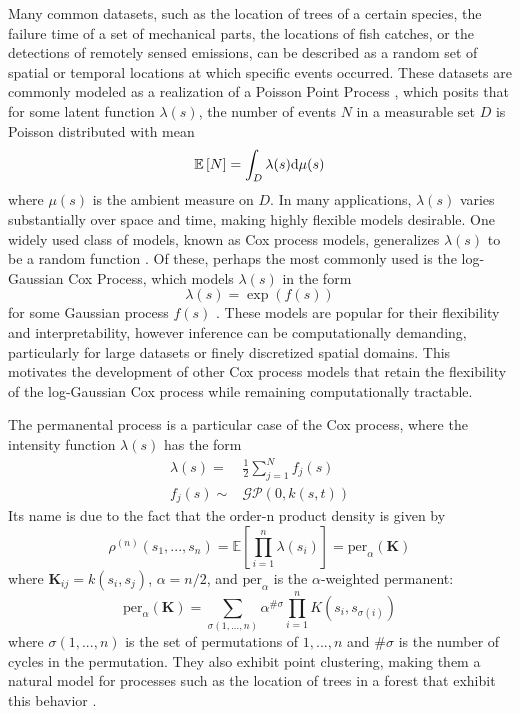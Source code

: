 \documentclass[ejsv2,preprint]{imsart}
\newcommand{\Expect}[1]{\mathbb{E}\left[ #1 \right]}
\newcommand{\diffd}{\textnormal{d}}
\begin{document}
Many common datasets, such as the location of trees of a certain species, the failure time of a set of mechanical parts, the locations of fish catches, or the detections of remotely sensed emissions, can be described as a random set of spatial or temporal locations at which specific events occurred. These datasets are commonly modeled as a realization of a Poisson Point Process \cite{streit.ppp}, which posits that for some latent function $\lambda(s)$, the number of events $N$ in a measurable set $D$ is Poisson distributed with mean 
\begin{equation}
    \Expect{N} = \int_D\lambda(s)\diffd\mu(s)
\end{equation}
where $\mu(s)$ is the ambient measure on $D$. In many applications, $\lambda(s)$ varies substantially over space and time, making highly flexible models desirable. One widely used class of models, known as Cox process models, generalizes $\lambda(s)$ to be a random function \cite{coxprocesses}. Of these, perhaps the most commonly used is the log-Gaussian Cox Process, which models $\lambda(s)$ in the form
\begin{equation}
    \lambda(s)=\exp\left(f(s)\right)
\end{equation}
for some Gaussian process $f(s)$ \cite{moller_lgcp}. These models are popular for their flexibility and interpretability, however inference can be computationally demanding, particularly for large datasets or finely discretized spatial domains. This motivates the development of other Cox process models that retain the flexibility of the log-Gaussian Cox process while remaining computationally tractable.

The permanental process \cite{mccullagh_permproc} is a particular case of the Cox process, where the intensity function $\lambda(s)$ has the form
\begin{equation}
    \begin{split}
        \lambda(s) = &\frac{1}{2}\sum_{j=1}^Nf_j(s)\\
        f_j(s)\sim& \mathcal{GP}(0,k(s,t))
    \end{split}
\end{equation}
Its name is due to the fact that the order-n product density is given by 
\cite{mccullagh_permproc}
\begin{equation}
    \rho^{(n)}(s_1,...,s_n)=\Expect{\prod_{i=1}^n\lambda(s_i)} = \text{per}_{\alpha}(\mathbf{K})
\end{equation}
where $\mathbf{K}_{ij}=k(s_i,s_j)$, $\alpha=n/2$, and $\text{per}_{\alpha}$ is the $\alpha$-weighted permanent:
\begin{equation}
    \text{per}_{\alpha}(\mathbf{K})=\sum_{\sigma(1,...,n)}\alpha^{\#\sigma}\prod_{i=1}^nK(s_i,s_{\sigma(i)})
\end{equation}
where $\sigma(1,...,n)$ is the set of permutations of $1,...,n$ and $\#\sigma$ is the number of cycles in the permutation. They also exhibit point clustering, making them a natural model for processes such as the location of trees in a forest that exhibit this behavior \cite{moller2005properties}.
\end{document}
